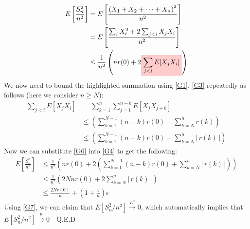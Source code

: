\documentclass{article}
\newcommand{\bracket}[1]{\left(#1\right)}
\newcommand{\highlight}[1]{%
  \colorbox{red!20}{$\displaystyle#1$}}
\newcommand{\abs}[1]{\vert \, #1 \, \vert}
\begin{document}
\begin{equation}
    \label{G4}
    \begin{split}
        E\left[ \frac{S_n^2}{n^2}\right] &= E\left[ \frac{\bracket{X_1+X_2+\dots+X_n}^2}{n^2}\right]\\
        &=  E\left[ \frac{\sum_{i} X_i^2 + 2 \sum_{j<i} X_j X_i}{n^2}\right]\\
        &\leq \frac{1}{n^2} \bracket{nr(0) + 2 \highlight{\sum_{j<i} E[X_j X_i]}}
    \end{split}
\end{equation}
We now need to bound the highlighted summation using \ref{G1}, \ref{G3} repeatedly as follows (here we consider $n \geq N$): 
\begin{equation}
    \label{G6}
    \begin{split}
        \sum_{j<i} E[X_j X_i] & = \sum_{k=1}^{n} \sum_{j=1}^{n-k} E[X_j X_{j+k}]\\
        &\leq \bracket{ \sum_{k=1}^{N-1}(n-k)r(0) + \sum_{k=N}^{n}r(k) }\\
        &\leq \bracket{ \sum_{k=1}^{N-1}(n-k) r(0) + \sum_{k=N}^{n} \abs{r(k)} }
    \end{split}
\end{equation}
Now we can substitute \ref{G6} into \ref{G4} to get the following: 
\begin{equation}
    \label{G7}
    \begin{split}
        E\left[ \frac{S_n^2}{n^2}\right] &\leq \frac{1}{n^2} \bracket{nr(0) + 2\left( \sum_{k=1}^{N-1}(n-k) r(0) + \sum_{k=N}^{n} \abs{r(k)}\right)}\\
        &\leq \frac{1}{n^2} \bracket{2Nnr(0) + 2\sum_{k=N}^{n} \abs{r(k)}}\\
        &\leq \frac{2Nr(0)}{n} + \left(1 + \frac{1}{n}\right)\epsilon
    \end{split}
\end{equation}
Using \ref{G7}, we can claim that $E[S_n^2/n^2] \xrightarrow{L^2} 0$, which automatically implies that $E[S_n^2/n^2] \xrightarrow{p} 0$ - Q.E.D
\newpage
\end{document}
